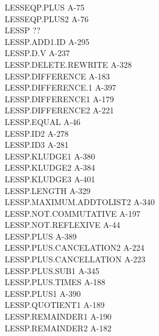 \documentclass[10pt]{book}
\newenvironment{pubasis}{\begin{flushleft}}{\end{flushleft}}
\begin{document}
\begin{pubasis}
LESSEQP.PLUS                                 A-75\\
LESSEQP.PLUS2                                A-76\\
LESSP                                        ??\\
LESSP.ADD1.ID                                A-295\\
LESSP.D.V                                    A-237\\
LESSP.DELETE.REWRITE                         A-328\\
LESSP.DIFFERENCE                             A-183\\
LESSP.DIFFERENCE.1                           A-397\\
LESSP.DIFFERENCE1                            A-179\\
LESSP.DIFFERENCE2                            A-221\\
LESSP.EQUAL                                  A-46\\
LESSP.ID2                                    A-278\\
LESSP.ID3                                    A-281\\
LESSP.KLUDGE1                                A-380\\
LESSP.KLUDGE2                                A-384\\
LESSP.KLUDGE3                                A-401\\
LESSP.LENGTH                                 A-329\\
LESSP.MAXIMUM.ADDTOLIST2                     A-340\\
LESSP.NOT.COMMUTATIVE                        A-197\\
LESSP.NOT.REFLEXIVE                          A-44\\
LESSP.PLUS                                   A-389\\
LESSP.PLUS.CANCELATION2                      A-224\\
LESSP.PLUS.CANCELLATION                      A-223\\
LESSP.PLUS.SUB1                              A-345\\
LESSP.PLUS.TIMES                             A-188\\
LESSP.PLUS1                                  A-390\\
LESSP.QUOTIENT1                              A-189\\
LESSP.REMAINDER1                             A-190\\
LESSP.REMAINDER2                             A-182\\

\end{pubasis}
\end{document}
